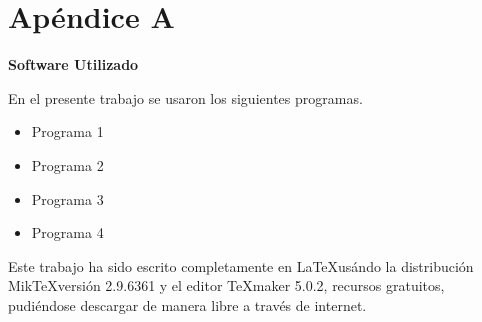 \chapter*{Apéndice A} %

\linespread{1.3}

\noindent \textbf{\large{Software Utilizado}}
\ \newline
\par

En el presente trabajo se usaron los siguientes programas.

\begin{itemize}
	\item Programa 1
	\item Programa 2
	\item Programa 3
	\item Programa 4
	
\end{itemize}

Este trabajo ha sido escrito completamente en  \LaTeX usándo la distribución Mik\TeX  versión 2.9.6361 y el editor \TeX maker 5.0.2, recursos gratuitos, pudiéndose descargar de manera libre a través de internet.
\clearpage %




\clearpage